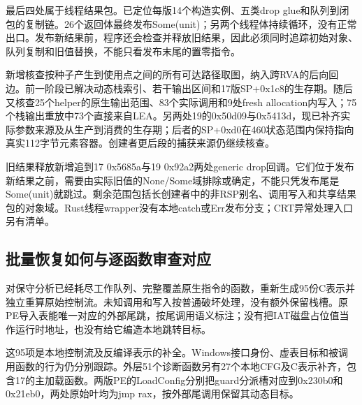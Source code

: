 \documentclass[UTF8,a4paper,zihao=5,fontset=windows]{ctexart}
\newcommand{\code}[1]{{\ttfamily\small #1}}
\begin{document}
最后四处属于线程结果包。已定位每版14个构造实例、五类drop glue和队列到闭包的复制链。26个返回体最终发布\code{Some(unit)}；另两个线程体持续循环，没有正常出口。发布新结果前，程序还会检查并释放旧结果，因此必须同时追踪初始对象、队列复制和旧值替换，不能只看发布末尾的置零指令。

新增核查按种子产生到使用点之间的所有可达路径取图，纳入跨RVA的后向回边。前一阶段已解决动态栈索引、若干输出区间和17版\code{SP+0x1c8}的生存期。随后又核查25个helper的原生输出范围、83个实际调用和9处fresh allocation内写入；75个栈输出重放中73个直接来自LEA。另两处19的\code{0x50d09}与\code{0x5413d}，现已补齐实际参数来源及从生产到消费的生存期；后者的\code{SP+0xd0}在460状态范围内保持指向真实112字节元素容器。创建者更后段的捕获来源仍继续核查。

旧结果释放新增追到17 \code{0x5685a}与19 \code{0x92a2}两处generic drop回调。它们位于发布新结果之前，需要由实际旧值的\code{None/Some}域排除或确定，不能只凭发布尾是\code{Some(unit)}就跳过。剩余范围包括长创建者中的非RSP别名、调用写入和共享结果包的对象域。Rust线程wrapper没有本地catch或Err发布分支；CRT异常处理入口另有清单。

\subsection{批量恢复如何与逐函数审查对应}
对保守分析已经耗尽工作队列、完整覆盖原生指令的函数，重新生成95份C表示并独立重算原始控制流。未知调用和写入按普通破坏处理，没有额外保留栈槽。原PE导入表能唯一对应的外部尾跳，按尾调用语义标注；没有把IAT磁盘占位值当作运行时地址，也没有给它编造本地跳转目标。

这95项是本地控制流及反编译表示的补全。Windows接口身份、虚表目标和被调用函数的行为仍分别跟踪。外层51个诊断函数另有27个本地CFG及C表示补齐，包含17的主加载函数。两版PE的LoadConfig分别把guard分派槽对应到\code{0x230b0}和\code{0x21eb0}，两处原始叶均为\code{jmp rax}，按外部尾调用保留其动态目标。
\end{document}
